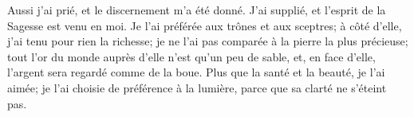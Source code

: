 Aussi j’ai prié, et le discernement m’a été donné.
	J’ai supplié, et l’esprit de la Sagesse est venu en moi.
Je l’ai préférée aux trônes et aux sceptres;
	à côté d’elle, j’ai tenu pour rien la richesse;
	je ne l’ai pas comparée à la pierre la plus précieuse;
	tout l’or du monde auprès d’elle n’est qu’un peu de sable,
	et, en face d’elle, l’argent sera regardé comme de la boue.
Plus que la santé et la beauté, je l’ai aimée;
	je l’ai choisie de préférence à la lumière, parce que sa clarté ne s’éteint pas.
